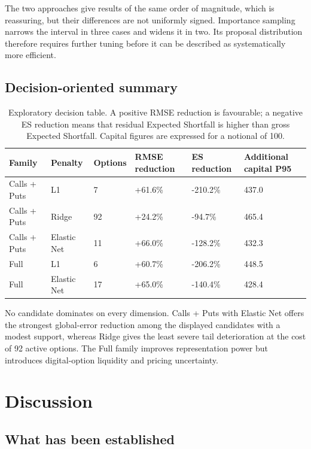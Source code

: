 \documentclass[11pt,a4paper]{article}
\begin{document}
The two approaches give results of the same order of magnitude, which is reassuring, but their differences are not uniformly signed. Importance sampling narrows the interval in three cases and widens it in two. Its proposal distribution therefore requires further tuning before it can be described as systematically more efficient.

\subsection{Decision-oriented summary}

\begin{table}[htbp]
\centering
\footnotesize
\begin{tabularx}{\textwidth}{L{2.2cm}L{2.0cm}R{1.5cm}R{2.0cm}R{2.0cm}R{2.0cm}}
\toprule
Family & Penalty & Options & RMSE reduction & ES reduction & Additional capital P95 \\
\midrule
Calls + Puts & L1 & 7 & +61.6\% & -210.2\% & 437.0 \\
Calls + Puts & Ridge & 92 & +24.2\% & -94.7\% & 465.4 \\
Calls + Puts & Elastic Net & 11 & +66.0\% & -128.2\% & 432.3 \\
Full & L1 & 6 & +60.7\% & -206.2\% & 448.5 \\
Full & Elastic Net & 17 & +65.0\% & -140.4\% & 428.4 \\
\bottomrule
\end{tabularx}
\caption{Exploratory decision table. A positive RMSE reduction is favourable; a negative ES reduction means that residual Expected Shortfall is higher than gross Expected Shortfall. Capital figures are expressed for a notional of 100.}
\end{table}

No candidate dominates on every dimension. Calls + Puts with Elastic Net offers the strongest global-error reduction among the displayed candidates with a modest support, whereas Ridge gives the least severe tail deterioration at the cost of 92 active options. The Full family improves representation power but introduces digital-option liquidity and pricing uncertainty.

\section{Discussion}

\subsection{What has been established}
\end{document}
